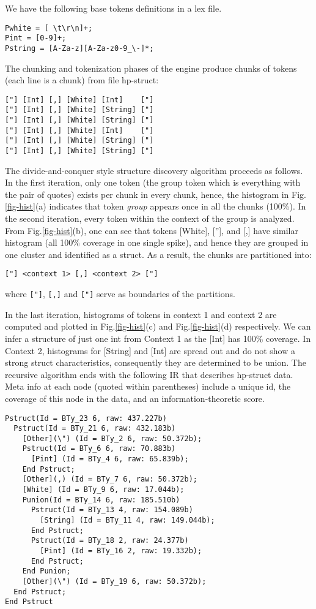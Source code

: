 \documentclass{sig-alternate-sigmod08}
\begin{document}
We have the following base tokens definitions in a lex file. 

{\small
\begin{verbatim}
Pwhite = [ \t\r\n]+;
Pint = [0-9]+;
Pstring = [A-Za-z][A-Za-z0-9_\-]*;
\end{verbatim}
}

The chunking and tokenization phases of the engine produce
chunks of tokens (each line is a chunk) from file hp-struct:
{\small
\begin{verbatim}
["] [Int] [,] [White] [Int]    ["]
["] [Int] [,] [White] [String] ["]
["] [Int] [,] [White] [String] ["]
["] [Int] [,] [White] [Int]    ["]
["] [Int] [,] [White] [String] ["]
["] [Int] [,] [White] [String] ["]
\end{verbatim}
}

The divide-and-conquer style structure discovery algorithm proceeds
as follows. In the first iteration, only one token (the group
token which is everything with the pair of quotes) exists per
chunk in every chunk, hence, the histogram in Fig.\ref{fig-hist}(a) indicates
that token {\em group} appears once in all the chunks (100\%).
In the second iteration, every token within the context of the
group is analyzed. From Fig.\ref{fig-hist}(b), one can see that
tokens [White], [''], and [,] have similar histogram
(all 100\% coverage in one single spike), and hence they are
grouped in one cluster and identified as a struct. As a result,
the chunks are partitioned into:

{\small
\begin{verbatim}
["] <context 1> [,] <context 2> ["]
\end{verbatim}
}
\noindent where \verb#["]#, \verb#[,]# and \verb#["]# serve as
boundaries of the partitions.

In the last iteration, histograms of tokens in context 1 and
context 2 are computed and plotted in Fig.\ref{fig-hist}(c) and Fig.\ref{fig-hist}(d) 
respectively. We can infer a structure of just one int
from Context 1 as the [Int] has 100\% coverage. In Context 2,
histograms for [String] and [Int] are spread out and do not
show a strong struct characteristics, consequently they are 
determined to be union. The recursive algorithm ends with
the following IR that describes hp-struct data. Meta info
at each node (quoted within parentheses) include a unique id, 
the coverage of this node in the data, 
and an information-theoretic score. 
{\small
\begin{verbatim}
Pstruct(Id = BTy_23 6, raw: 437.227b)
  Pstruct(Id = BTy_21 6, raw: 432.183b)
    [Other](\") (Id = BTy_2 6, raw: 50.372b);
    Pstruct(Id = BTy_6 6, raw: 70.883b)
      [Pint] (Id = BTy_4 6, raw: 65.839b);
    End Pstruct;
    [Other](,) (Id = BTy_7 6, raw: 50.372b);
    [White] (Id = BTy_9 6, raw: 17.044b);
    Punion(Id = BTy_14 6, raw: 185.510b)
      Pstruct(Id = BTy_13 4, raw: 154.089b)
        [String] (Id = BTy_11 4, raw: 149.044b);
      End Pstruct;
      Pstruct(Id = BTy_18 2, raw: 24.377b)
        [Pint] (Id = BTy_16 2, raw: 19.332b);
      End Pstruct;
    End Punion;
    [Other](\") (Id = BTy_19 6, raw: 50.372b);
  End Pstruct;
End Pstruct
\end{verbatim}
}
\end{document}
